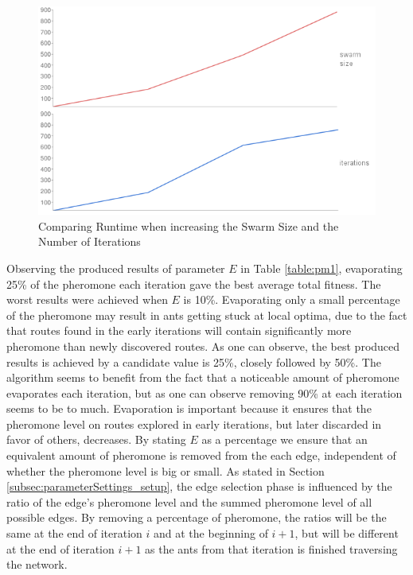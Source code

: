 
\begin{figure}[H]
\begin{center}
  \includegraphics[width=5in]{assets/iterations_swarmsize_runtime.png}
  \end{center}
  \caption{Comparing Runtime when increasing the Swarm Size and the Number of Iterations}
  \label{fig:svsiruntime} 
\end{figure}

Observing the produced results of parameter $E$ in Table \vref{table:pm1}, evaporating 25\% of the pheromone each iteration gave the best average total fitness. The worst results were achieved when $E$ is 10\%. Evaporating only a small percentage of the pheromone may result in ants getting stuck at local optima, due to the fact that routes found in the early iterations will contain significantly more pheromone than newly discovered routes. As one can observe, the best produced results is achieved by a candidate value is 25\%, closely followed by 50\%. The algorithm seems to benefit from the fact that a noticeable amount of pheromone evaporates each iteration, but as one can observe removing 90\% at each iteration seems to be to much. Evaporation is important because it ensures that the pheromone level on routes explored in early iterations, but later discarded in favor of others, decreases. By stating $E$ as a percentage we ensure that an equivalent amount of pheromone is removed from the each edge, independent of whether the pheromone level is big or small. As stated in Section \vref{subsec:parameterSettings_setup}, the edge selection phase is influenced by the ratio of the edge's pheromone level and the summed pheromone level of all possible edges. By removing a percentage of pheromone, the ratios will be the same at the end of iteration $i$ and at the beginning of $i+1$, but will be different at the end of iteration $i+1$ as the ants from that iteration is finished traversing the network. 
\newline


